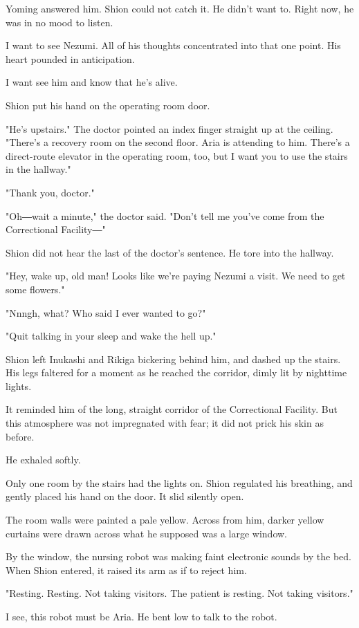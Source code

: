 Yoming answered him. Shion could not catch it. He didn't want to. Right
now, he was in no mood to listen.

I want to see Nezumi. All of his thoughts concentrated into that one
point. His heart pounded in anticipation.

I want see him and know that he's alive.

Shion put his hand on the operating room door.

"He's upstairs." The doctor pointed an index finger straight up at the
ceiling. "There's a recovery room on the second floor. Aria is attending
to him. There's a direct-route elevator in the operating room, too, but
I want you to use the stairs in the hallway."

"Thank you, doctor."

"Oh―wait a minute," the doctor said. "Don't tell me you've come from the
Correctional Facility―"

Shion did not hear the last of the doctor's sentence. He tore into the
hallway.

"Hey, wake up, old man! Looks like we're paying Nezumi a visit. We need
to get some flowers."

"Nnngh, what? Who said I ever wanted to go?"

"Quit talking in your sleep and wake the hell up."

Shion left Inukashi and Rikiga bickering behind him, and dashed up the
stairs. His legs faltered for a moment as he reached the corridor, dimly
lit by nighttime lights.

It reminded him of the long, straight corridor of the Correctional
Facility. But this atmosphere was not impregnated with fear; it did not
prick his skin as before.

He exhaled softly.

Only one room by the stairs had the lights on. Shion regulated his
breathing, and gently placed his hand on the door. It slid silently
open.

The room walls were painted a pale yellow. Across from him, darker
yellow curtains were drawn across what he supposed was a large window.

By the window, the nursing robot was making faint electronic sounds by
the bed. When Shion entered, it raised its arm as if to reject him.

"Resting. Resting. Not taking visitors. The patient is resting. Not
taking visitors."

I see, this robot must be Aria. He bent low to talk to the robot.

